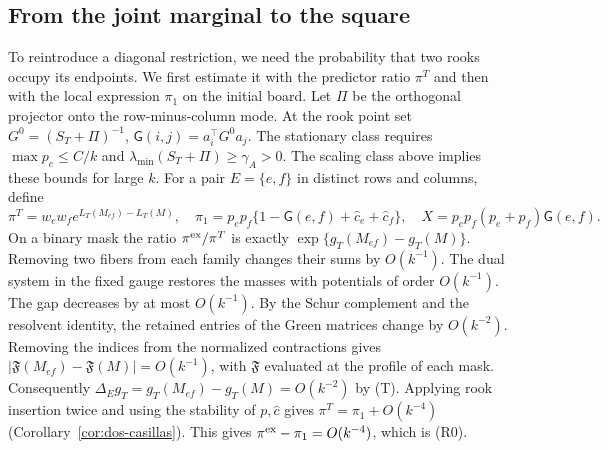 \subsection{From the joint marginal to the square}
\label{app:pair} To reintroduce a diagonal restriction, we need the probability that two rooks
occupy its endpoints. We first estimate it with the predictor ratio $\pi^T$ and then with the
local expression $\pi_1$ on the initial board. Let $\Pi$ be the orthogonal projector onto the
row-minus-column mode. At the rook point set $G^0=(S_T+\Pi)^{-1}$, $\mathsf G(i,j)=a_i^\top
G^0a_j$. The stationary class requires $\max p_e\le C/k$ and
$\lambda_{\min}(S_T+\Pi)\ge\gamma_A>0$. The scaling class above implies these bounds for large
$k$. For a pair $E=\{e,f\}$ in distinct rows and columns, define
\[
 \pi^T=w_ew_f e^{L_T(M_{ef})-L_T(M)},\quad
 \pi_1=p_ep_f\{1-\mathsf G(e,f)+\hat c_e+\hat c_f\},\quad
 X=p_ep_f(p_e+p_f)\mathsf G(e,f).
\]
On a binary mask the ratio $\pi^{\rm ex}/\pi^T$ is exactly $\exp\{g_T(M_{ef})-g_T(M)\}$. Removing
two fibers from each family changes their sums by $O(k^{-1})$. The dual system in the fixed gauge
restores the masses with potentials of order $O(k^{-1})$. The gap decreases by at most
$O(k^{-1})$. By the Schur complement and the resolvent identity, the retained entries of the Green
matrices change by $O(k^{-2})$. Removing the indices from the normalized contractions gives
$|\mathfrak F(M_{ef})-\mathfrak F(M)|=O(k^{-1})$, with $\mathfrak F$ evaluated at the profile of
each mask. Consequently $\Delta_E g_T=g_T(M_{ef})-g_T(M)=O(k^{-2})$ by (T). Applying rook
insertion twice and using the stability of $p,\hat c$ gives $\pi^T=\pi_1+O(k^{-4})$
(Corollary~\ref{cor:dos-casillas}). This gives $\pi^{\rm ex}-\pi_1=O(k^{-4})$, which is (R0).

